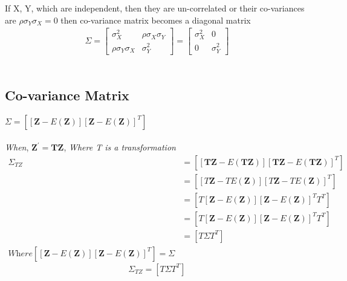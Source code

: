 \documentclass{article}
\begin{document}
If X, Y, which  are independent, then they are un-correlated or their co-variances are $\rho \sigma_{Y} \sigma_{X} = 0$ then co-variance matrix becomes a diagonal matrix\\
\begin{align*}
    \Sigma = \begin{bmatrix}
         \sigma_{X}^2                  &     \rho \sigma_{X} \sigma_{Y}\\
         \rho \sigma_{Y} \sigma_{X}     &      \sigma_{Y}^2
        \end{bmatrix} 
        = \begin{bmatrix}
         \sigma_{X}^2      & 0\\
          0  & \sigma_{Y}^2
        \end{bmatrix}
\end{align*}\\
\subsection{Co-variance Matrix}
    $\Sigma = [[\mathbf{Z} - E(\mathbf{Z})][\mathbf{Z} - E(\mathbf{Z})]^T]$\\
    \\\textit{When}, \hspace{5pt} $\mathbf{Z^{'} = TZ}$, \hspace{5pt} \textit{Where T is a transformation}\\
\begin{align*}
    \Sigma_{TZ} &= [[\mathbf{TZ} - E(\mathbf{TZ})][\mathbf{TZ} - E(\mathbf{TZ})]^T]\\
    &= [[T\mathbf{Z} - T E(\mathbf{Z})][T\mathbf{Z} - TE(\mathbf{Z})]^T]\\
    &= [T[\mathbf{Z} - E(\mathbf{Z})][\mathbf{Z} - E(\mathbf{Z})]^T T^T]\\
    &= [T[\mathbf{Z} - E(\mathbf{Z})][\mathbf{Z} - E(\mathbf{Z})]^T T^T]\\
    &=  [T \Sigma T^T]\\
    \textit{Where} [[\mathbf{Z} - E(\mathbf{Z})][\mathbf{Z} - E(\mathbf{Z})]^T] = \Sigma
\end{align*}
\begin{equation}
    \Sigma_{TZ} = [T \Sigma T^T]
\end{equation}
\end{document}

